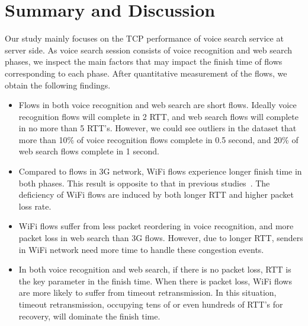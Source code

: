 
\section{Summary and Discussion}
\label{sec:discuss}

Our study mainly focuses on the TCP performance of voice search service at server side. As voice search session consists of voice recognition and web search phases, we inspect the main factors that may impact the finish time of flows corresponding to each phase. After quantitative measurement of the flows, we obtain the following findings.

\begin{itemize}
	\item Flows in both voice recognition and web search are short flows. Ideally voice recognition flows will complete in 2 RTT, and web search flows will complete in no more than 5 RTT's. However, we could see outliers in the dataset that more than 10\% of voice recognition flows complete in 0.5 second, and 20\% of web search flows complete in 1 second.

	\item Compared to flows in 3G network, WiFi flows experience longer finish time in both phases. This result is opposite to that in previous studies~\cite{deshpande2010performance,sommers2012cell}. The deficiency of WiFi flows are induced by both longer RTT and higher packet loss rate.

	\item WiFi flows suffer from less packet reordering in voice recognition, and more packet loss in web search than 3G flows. However, due to longer RTT, senders in WiFi network need more time to handle these congestion events.

	\item In both voice recognition and web search, if there is no packet loss, RTT is the key parameter in the finish time. When there is packet loss, WiFi flows are more likely to suffer from timeout retransmission. In this situation, timeout retransmission, occupying tens of or even hundreds of RTT's for recovery, will dominate the finish time.
\end{itemize}

